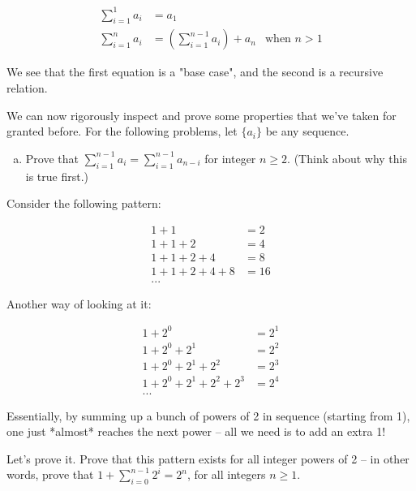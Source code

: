 \begin{problem}
\begin{align*}
\sum_{i=1}^1 a_i &= a_1 \\
\sum_{i=1}^n a_i &= \left(\sum_{i=1}^{n-1} a_i\right) + a_n & \text{when } n > 1
\end{align*}

We see that the first equation is a "base case", and the second is a recursive relation. 




We can now rigorously inspect and prove some properties that we've taken for granted before. For the following problems, let $\{a_i\}$ be any sequence. 



\begin{enumerate}[(a)]
\item Prove that $\sum_{i=1}^{n-1} a_i = \sum_{i=1}^{n-1} a_{n-i}$ for integer $n \geq 2$. (Think about why this is true first.)
\end{enumerate}


\end{problem}


\begin{problem}
\label{power-2-sum}

Consider the following pattern:

\begin{align*}
1 + 1 &= 2 \\
1 + 1 + 2 &= 4 \\
1 + 1 + 2 + 4 &= 8 \\
1 + 1 + 2 + 4 + 8 &= 16 \\
...
\end{align*}


Another way of looking at it:

\begin{align*}
1 + 2^0 &= 2^1 \\
1 + 2^0 + 2^1 &= 2^2 \\
1 + 2^0 + 2^1 + 2^2 &= 2^3 \\
1 + 2^0 + 2^1 + 2^2 + 2^3 &= 2^4 \\
...
\end{align*}


Essentially, by summing up a bunch of powers of 2 in sequence (starting from 1), one just *almost* reaches the next power -- all we need is to add an extra 1!


Let's prove it. Prove that this pattern exists for all integer powers of 2 -- in other words, prove that $1 + \sum_{i=0}^{n-1} 2^i = 2^n$, for all integers $n \geq 1$.

\end{problem}


